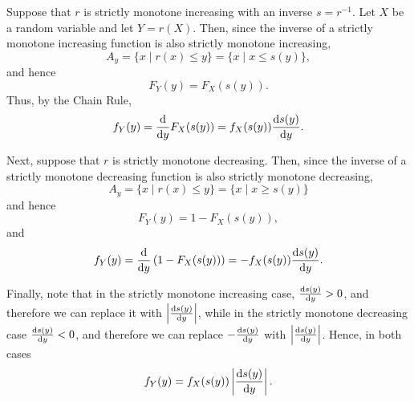 \begin{ex}
  Suppose that $r$ is strictly monotone increasing with an inverse $s=r^{-1}$.
  Let $X$ be a random variable and let $Y=r(X)$.
  Then, since the inverse of a strictly monotone increasing function is also
  strictly monotone increasing,
  \[
    A_y
    =\{x \mid r(x) \leq y \}
    =\{x \mid x \leq s(y) \},
  \]
  and hence
  \[
    F_Y(y) = F_X(s(y)).
  \]
  Thus, by the Chain Rule,
  \[
    f_Y(y)=\frac{\mathrm{d}}{\mathrm{d}{y}}F_X(s(y))=f_X(s(y))\frac{\mathrm{d}{s(y)}}{\mathrm{d}{y}}.
  \]

  Next, suppose that $r$ is strictly monotone decreasing. Then, since the
  inverse of a strictly monotone decreasing function is also
  strictly monotone decreasing,
  \[
    A_y
    =\{x \mid r(x) \leq y \}
    =\{x \mid x \geq s(y) \}
  \]
  and hence
  \[
    F_Y(y) = 1-F_X(s(y)),
  \]
  and
  \[
    f_Y(y)=\frac{\mathrm{d}}{\mathrm{d}{y}}\left(1-F_X(s(y))\right)=-f_X(s(y))\frac{\mathrm{d}{s(y)}}{\mathrm{d}{y}}.
  \]

  Finally, note that in the strictly monotone increasing case,
  $\frac{\mathrm{d}{s(y)}}{\mathrm{d}{y}}>0$, and therefore we can replace it with
  $\left|\frac{\mathrm{d}{s(y)}}{\mathrm{d}{y}}\right|$, while in the strictly monotone
  decreasing case $\frac{\mathrm{d}{s(y)}}{\mathrm{d}{y}}<0$, and therefore we can replace
  $-\frac{\mathrm{d}{s(y)}}{\mathrm{d}{y}}$ with $\left|\frac{\mathrm{d}{s(y)}}{\mathrm{d}{y}}\right|$.
  Hence, in both cases
  \[
    f_Y(y)=f_X(s(y))\left|\frac{\mathrm{d}{s(y)}}{\mathrm{d}{y}}\right|.
  \]
\end{ex}

